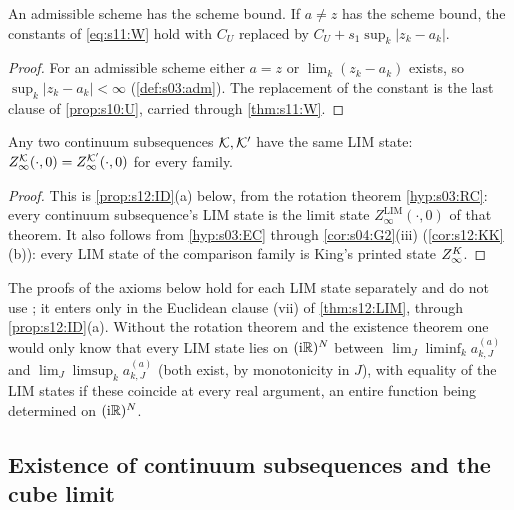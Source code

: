 \begin{lemma}\label{hyp:s12:SCH}
An admissible scheme has the scheme bound. If $a\ne z$ has the scheme bound, the constants of \eqref{eq:s11:W} hold with $C_U$ replaced by $C_U+s_1\sup_k|z_k-a_k|$.
\end{lemma}

\begin{proof}
For an admissible scheme either $a=z$ or $\lim_k(z_k-a_k)$ exists, so $\sup_k|z_k-a_k|<\infty$ (\cref{def:s03:adm}). The replacement of the constant is the last clause of \cref{prop:s10:U}, carried through \cref{thm:s11:W}.
\end{proof}

\begin{proposition}\label{hyp:s12:UNIQ}
Any two continuum subsequences $\mathcal K,\mathcal K'$ have the same LIM state: $Z^{\mathcal K}_{\infty}(\cdot,0)=Z^{\mathcal K'}_{\infty}(\cdot,0)$ for every family.
\end{proposition}

\begin{proof}
This is \cref{prop:s12:ID}(a) below, from the rotation theorem \cref{hyp:s03:RC}: every continuum subsequence's LIM state is the limit state $Z^{\mathrm{LIM}}_\infty(\cdot,0)$ of that theorem. It also follows from \cref{hyp:s03:EC} through \cref{cor:s04:G2}(iii) (\cref{cor:s12:KK}(b)): every LIM state of the comparison family is King's printed state $Z^{K}_{\infty}$.
\end{proof}

The proofs of the axioms below hold for each LIM state separately and do not use \UNIQ; it enters only in the Euclidean clause (vii) of \cref{thm:s12:LIM}, through \cref{prop:s12:ID}(a). Without the rotation theorem and the existence theorem one would only know that every LIM state lies on $(\mathrm i\mathbb R)^N$ between $\lim_J\liminf_ka^{(a)}_{k,J}$ and $\lim_J\limsup_ka^{(a)}_{k,J}$ (both exist, by monotonicity in $J$), with equality of the LIM states if these coincide at every real argument, an entire function being determined on $(\mathrm i\mathbb R)^N$.

\subsection{Existence of continuum subsequences and the cube limit}

